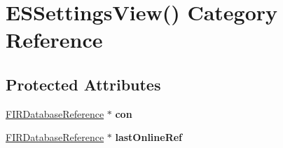 \hypertarget{category_e_s_settings_view_07_08}{}\section{E\+S\+Settings\+View() Category Reference}
\label{category_e_s_settings_view_07_08}
\subsection*{Protected Attributes}
\begin{DoxyCompactItemize}
\item 
\hypertarget{category_e_s_settings_view_07_08_ae58e30572ed7f079c58f03678b0ba633}{}\hyperlink{interface_f_i_r_database_reference}{F\+I\+R\+Database\+Reference} $\ast$ {\bfseries con}\label{category_e_s_settings_view_07_08_ae58e30572ed7f079c58f03678b0ba633}

\item 
\hypertarget{category_e_s_settings_view_07_08_a3d9ae60b5ea19f5b55625b431b44f95e}{}\hyperlink{interface_f_i_r_database_reference}{F\+I\+R\+Database\+Reference} $\ast$ {\bfseries last\+Online\+Ref}\label{category_e_s_settings_view_07_08_a3d9ae60b5ea19f5b55625b431b44f95e}

\end{DoxyCompactItemize}
